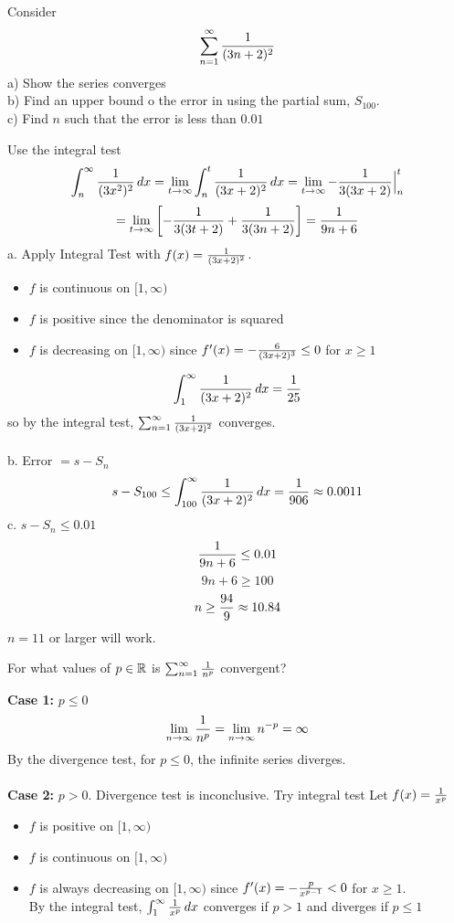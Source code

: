 \documentclass[english, 12pt]{article}
\begin{document}

\begin{exmp}
Consider
\[\sum_{n=1}^\infty \frac{1}{(3n+2)^2}\]
a) Show the series converges\\
b) Find an upper bound o the error in using the partial sum, $S_{100}$.\\
c) Find $n$ such that the error is less than $0.01$
\begin{sol}
Use the integral test
\[\int_n^\infty \frac{1}{(3x^2)^2}\,dx = \lim_{t\to\infty} \int_n^t \frac{1}{(3x+2)^2}\,dx = \lim_{t\to\infty} - \frac{1}{3(3x+2)}\Big|_n^t\]
\[= \lim_{t\to\infty} \left\lbrack -\frac{1}{3(3t+2)} + \frac{1}{3(3n+2)}\right\rbrack = \frac{1}{9n+6}\]
a. Apply Integral Test with $f(x) = \frac{1}{(3x+2)^2}$.
\begin{itemize}
\item $f$ is continuous on $\lbrack 1,\infty)$
\item $f$ is positive since the denominator is squared
\item $f$ is decreasing on $\lbrack 1,\infty)$ since $f'(x) = - \frac{6}{(3x+2)^3} \leq 0$ for $x \geq 1$
\end{itemize}
\[\int_1^\infty \frac{1}{(3x+2)^2}\,dx = \frac{1}{25}\]
so by the integral test, $\sum_{n=1}^\infty \frac{1}{(3x+2)^2}$ converges.\\\\
b. Error $= s-S_{n}$
\[s-S_{100} \leq \int_{100}^\infty \frac{1}{(3x+2)^2}\,dx = \frac{1}{906} \approx 0.0011\]
c. $s-S_{n} \leq 0.01$
\[ \frac{1}{9n+6} \leq 0.01\]
\[9n + 6 \geq 100\]
\[n \geq \frac{94}{9} \approx 10.84\]
$n=11$ or larger will work.
\end{sol}
\end{exmp}
\begin{exmp}
For what values of $p \in {\mathbb{R}}$ is $\sum_{n=1}^\infty \frac{1}{n^p}$ convergent?
\begin{sol}
\textbf{Case 1:} $p\leq 0$
\[\lim_{n\to\infty} \frac{1}{n^p} = \lim_{n\to\infty} n^{-p} = \infty \]
By the divergence test, for $p \leq 0$, the infinite series diverges.\\\\
\textbf{Case 2:} $p > 0$. Divergence test is inconclusive. Try integral test
Let $f(x) = \frac{1}{x^p}$
\begin{itemize}
\item $f$ is positive on $\lbrack 1,\infty)$
\item $f$ is continuous on $\lbrack 1, \infty)$
\item $f$ is always decreasing on $\lbrack 1, \infty)$ since $f'(x) = - \frac{p}{x^{p-1}} < 0$ for $x \geq 1$.\\
By the integral test, $\int_1^\infty \frac{1}{x^p}\,dx$ converges if $ p > 1$ and diverges if $p \leq 1$
\end{itemize}
\end{sol}
\end{exmp}
\end{document}
